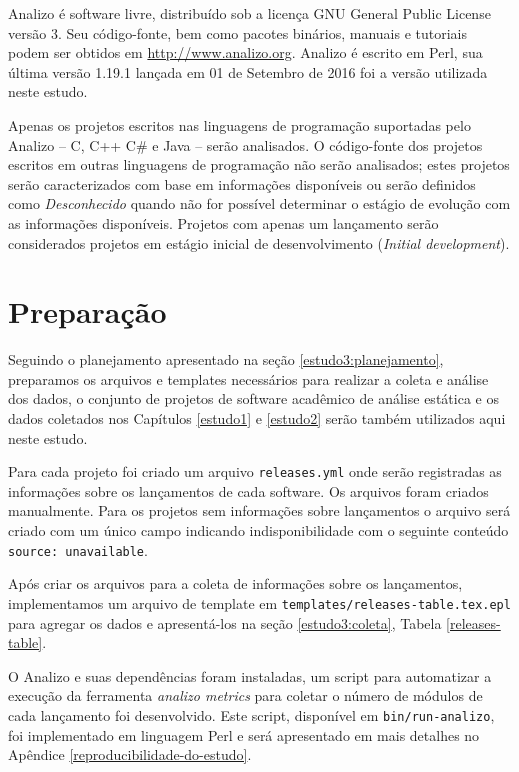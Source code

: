 Analizo é software livre, distribuído sob a licença GNU General Public License
versão 3. Seu código-fonte, bem como pacotes binários, manuais e tutoriais
podem ser obtidos em \url{http://www.analizo.org}. Analizo é escrito em Perl,
sua última versão 1.19.1 lançada em 01 de Setembro de 2016 foi a versão
utilizada neste estudo.

Apenas os projetos escritos nas linguagens de programação suportadas pelo Analizo 
-- C, C++ C\# e Java -- serão analisados.
O código-fonte dos projetos escritos em
outras linguagens de programação não serão analisados; 
estes projetos serão caracterizados com base em informações disponíveis ou 
serão definidos como {\it Desconhecido} quando não for possível determinar 
o estágio de evolução com as informações disponíveis. Projetos com apenas um
lançamento serão considerados projetos em estágio inicial de desenvolvimento
({\it Initial development}).


\section{Preparação} \label{estudo3:preparacao} %

Seguindo o planejamento apresentado na seção \ref{estudo3:planejamento},
preparamos os arquivos e templates necessários para realizar a coleta e análise
dos dados, o conjunto de projetos de software acadêmico de análise estática e
os dados coletados nos Capítulos \ref{estudo1} e \ref{estudo2} serão também
utilizados aqui neste estudo.

Para cada projeto foi criado um arquivo \texttt{releases.yml}
onde serão registradas as
informações sobre os lançamentos de cada software. Os arquivos foram criados
manualmente. Para os projetos sem informações sobre lançamentos o arquivo será
criado com um único campo indicando indisponibilidade com o seguinte conteúdo
\texttt{source: unavailable}.

Após criar os arquivos para a coleta de informações sobre os lançamentos,
implementamos um arquivo de template em
\texttt{templates/releases-table.tex.epl} para agregar os dados e apresentá-los
na seção \ref{estudo3:coleta}, Tabela \ref{releases-table}.

O Analizo e suas dependências foram instaladas, um script para automatizar a
execução da ferramenta {\it analizo metrics} para coletar o número de módulos
de cada lançamento foi desenvolvido. Este script, disponível em
\texttt{bin/run-analizo}, foi implementado em linguagem Perl e será apresentado
em mais detalhes no Apêndice \ref{reproducibilidade-do-estudo}.

